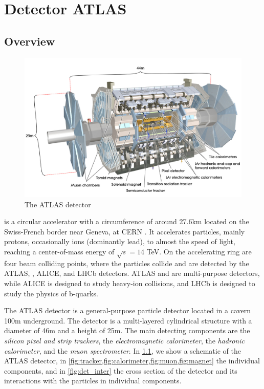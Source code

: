 \chapter{Detector ATLAS}

\section{Overview}
\begin{figure}[htb]
    \centering
    \includegraphics[width=1\linewidth]{src/img/atlas.jpg}
    \caption{The ATLAS detector}
    \label{fig:atlas}
\end{figure}

\LHC is a circular accelerator with a circumference of around 27.6km located on the Swiss-French border near Geneva, at CERN \cite{cern}.
It accelerates particles, mainly protons, occasionally ions (dominantly lead), to almost the speed of light, reaching a center-of-mass energy of $\sqrt{s} = 14$ TeV.
On the accelerating ring are four beam colliding points, where the particles collide and are detected by the ATLAS, \CMS, ALICE, and LHCb detectors.
ATLAS and \CMS are multi-purpose detectors, while ALICE is designed to study heavy-ion collisions, and LHCb is designed to study the physics of b-quarks.


The ATLAS detector \cite{ATLAS} is a general-purpose particle detector located in a cavern 100m underground.
The detector is a multi-layered cylindrical structure with a diameter of 46m and a height of 25m.
The main detecting components are the \emph{silicon pixel and strip trackers}, the \emph{electromagnetic \LAr calorimeter}, the \emph{hadronic calorimeter}, and the \emph{muon spectrometer}.
In \cref{fig:atlas}, we show a schematic of the ATLAS detector, in \cref{fig:tracker,fig:calorimeter,fig:muon,fig:magnet} the individual components, and in \cref{fig:det_inter} the cross section of the detector and its interactions with the particles in individual components.


